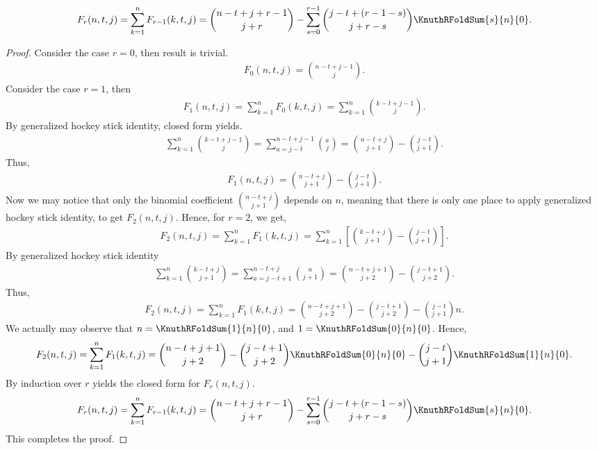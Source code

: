 \begin{proposition}
  \begin{align*}
    F_{r} (n,t,j)
    = \sum_{k=1}^{n} F_{r-1} (k,t,j)
    = \binom{n-t+j+r-1}{j+r}
    -
    \sum_{s=0}^{r-1} \binom{j-t+(r-1-s)}{j+r-s}
    \KnuthRFoldSum{s}{n}{0}.
  \end{align*}
  \begin{proof}
    Consider the case $r=0$, then result is trivial.
    \begin{align*}
      F_0 (n,t,j) = \binom{n-t+j-1}{j}.
    \end{align*}
    Consider the case $r=1$, then
    \begin{align*}
      F_1 (n,t,j)
      = \sum_{k=1}^{n} F_0 (k,t,j)
      = \sum_{k=1}^{n} \binom{k-t+j-1}{j}.
    \end{align*}
    By generalized hockey stick identity, closed form
    yields.
    \begin{align*}
      \sum_{k=1}^{n} \binom{k-t+j-1}{j}
      =\sum_{a=j-t}^{n-t+j-1} \binom{a}{j}
      = \binom{n-t+j}{j+1} - \binom{j-t}{j+1}.
    \end{align*}
    Thus,
    \begin{align*}
      F_1 (n,t,j) = \binom{n-t+j}{j+1} - \binom{j-t}{j+1}.
    \end{align*}
    Now we may notice that only the binomial coefficient
    $\binom{n-t+j}{j+1}$ depends on $n$, meaning that
    there is only one place to apply generalized hockey stick
    identity, to get $F_2 (n, t, j)$.
    Hence, for $r=2$, we get,
    \begin{align*}
      F_2 (n,t,j)
      = \sum_{k=1}^{n} F_1 (k,t,j)
      = \sum_{k=1}^{n} \left[ \binom{k-t+j}{j+1} - \binom{j-t}{j+1} \right].
    \end{align*}
    By generalized hockey stick identity
    \begin{align*}
      \sum_{k=1}^{n} \binom{k-t+j}{j+1}
      =\sum_{a=j-t+1}^{n-t+j} \binom{a}{j+1}
      = \binom{n-t+j+1}{j+2} - \binom{j-t+1}{j+2}.
    \end{align*}
    Thus,
    \begin{align*}
      F_2 (n,t,j)
      = \sum_{k=1}^{n} F_1 (k,t,j)
      = \binom{n-t+j+1}{j+2} - \binom{j-t+1}{j+2} - \binom{j-t}{j+1} n.
    \end{align*}
    We actually may observe that $n=\KnuthRFoldSum{1}{n}{0}$,
    and $1=\KnuthRFoldSum{0}{n}{0}$.
    Hence,
    \begin{align*}
      F_2 (n,t,j)
      = \sum_{k=1}^{n} F_1 (k,t,j)
      = \binom{n-t+j+1}{j+2}
      - \binom{j-t+1}{j+2} \KnuthRFoldSum{0}{n}{0}
      - \binom{j-t}{j+1} \KnuthRFoldSum{1}{n}{0}.
    \end{align*}
    By induction over $r$ yields the closed form for $F_r (n,t,j)$.
    \begin{align*}
      F_{r} (n,t,j)
      = \sum_{k=1}^{n} F_{r-1} (k,t,j)
      = \binom{n-t+j+r-1}{j+r}
      -
      \sum_{s=0}^{r-1} \binom{j-t+(r-1-s)}{j+r-s}
      \KnuthRFoldSum{s}{n}{0}.
    \end{align*}
    This completes the proof.
  \end{proof}
\end{proposition}

